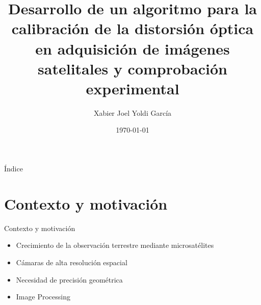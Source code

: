 \documentclass[aspectratio=169]{beamer}
\title[Corrección distorsión óptica]{Desarrollo de un algoritmo para la calibración de la distorsión óptica en adquisición de imágenes satelitales y comprobación experimental}
\author{Xabier Joel Yoldi García}
\institute{Grado en Física \\ EHU}
\date{\today}
\newcommand{\lightit}[1]{{\lightitfont #1}}
\begin{document}
\begin{frame}
\titlepage
\end{frame}

\begin{frame}{Índice}
\tableofcontents
\end{frame}

\section{Contexto y motivación}
\begin{frame}{Contexto y motivación}
\begin{itemize}
    \item Crecimiento de la observación terrestre mediante microsatélites
    \item Cámaras de alta resolución espacial
    \item Necesidad de precisión geométrica
    \item \lightit{Image Processing}
\end{itemize}
\end{frame}
\end{document}

